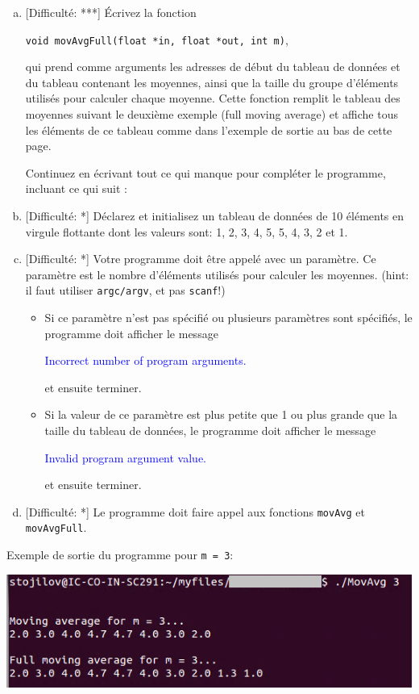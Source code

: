 \documentclass[11pt]{article}
\begin{document}
\begin{enumerate}[a)]
\item \textcolor{mygreen}{[Difficulté: ***]}
Écrivez la fonction

\begin{center} 
\texttt{void movAvgFull(float *in, float *out, int m)}, 
\end{center}

qui prend comme arguments les adresses de début du tableau de données et du tableau contenant les moyennes, ainsi que la taille du groupe d'éléments utilisés pour calculer chaque moyenne. Cette fonction remplit le tableau des moyennes suivant le deuxième exemple (full moving average) et affiche tous les éléments de ce tableau comme dans l'exemple de sortie au bas de cette page.

\vspace{20pt}
\hspace{-20pt} Continuez en écrivant tout ce qui manque pour compléter le programme, incluant ce qui suit :
\vspace{20pt}

\item \textcolor{mygreen}{[Difficulté: *]} Déclarez et initialisez un tableau de données de 10 éléments en virgule flottante dont les valeurs sont: 1, 2, 3, 4, 5, 5, 4, 3, 2 et 1.

\item \textcolor{mygreen}{[Difficulté: *]}  Votre programme doit être appelé avec un paramètre. Ce paramètre est le nombre d'éléments utilisés pour calculer les moyennes. (hint: il faut utiliser \texttt{argc/argv}, et pas \texttt{scanf}!)
	\begin{itemize}

	\item Si ce paramètre n'est pas spécifié ou plusieurs paramètres sont spécifiés, le programme doit afficher le message
	\begin{center}
	\textcolor{blue}{Incorrect number of program arguments.}
	\end{center}
	et ensuite terminer.

	\item Si la valeur de ce  paramètre est plus petite que 1 ou plus grande que la taille du tableau de données, le programme doit afficher le message
	\begin{center}
	\textcolor{blue}{Invalid program argument value.}
	\end{center}
	et ensuite terminer.

	\end{itemize}

\item \textcolor{mygreen}{[Difficulté: *]}  Le programme doit faire appel aux fonctions \texttt{movAvg} et \texttt{movAvgFull}.
\end{enumerate}

\vspace{20pt}

Exemple de sortie du programme pour \texttt{m = 3}:
\begin{center}
\includegraphics[scale=0.75]{Figures/Result.png}
\end{center}
\end{document}
